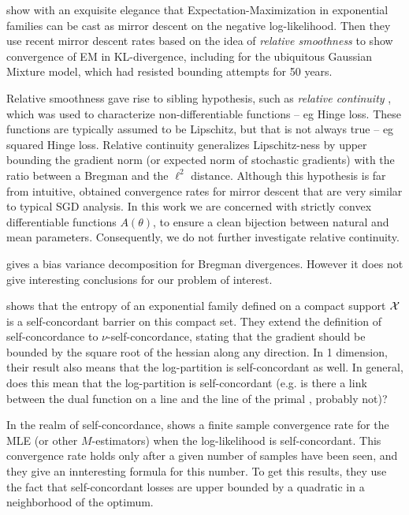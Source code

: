 \documentclass{article}
\newcommand{\logpart}{A}
\newcommand{\nat}{\theta}
\begin{document}
\citet{kunstner2020homeomorphic} show with an exquisite elegance that Expectation-Maximization in exponential families can be cast as mirror descent on the negative log-likelihood. Then they use recent mirror descent rates based on the idea of \textit{relative smoothness} \citep{birnbaum2011distributed, bauschke2017descent, lu2018relatively} to show convergence of EM in KL-divergence, including for the ubiquitous Gaussian Mixture model, which had resisted bounding attempts for 50 years.

Relative smoothness gave rise to sibling hypothesis, such as \textit{relative continuity} \citep{lu2019relative},  which was used to characterize non-differentiable functions -- eg Hinge loss. These functions are typically assumed to be Lipschitz, but that is not always true -- eg squared Hinge loss. Relative continuity generalizes Lipschitz-ness by upper bounding the gradient norm (or expected norm of stochastic gradients) with the ratio between a Bregman and the $\ell^2$ distance. Although this hypothesis is far from intuitive, \citet{lu2019relative} obtained convergence rates for mirror descent that are very similar to typical SGD analysis. In this work we are concerned with strictly convex differentiable functions $\logpart(\nat)$, to ensure a clean bijection between natural and mean parameters. Consequently, we do not further investigate relative continuity.

\citet{pfau2013generalized} gives a bias variance decomposition for Bregman divergences. However it does not give interesting conclusions for our problem of interest.


\citet{bubeck2015entropic} shows that the entropy of an exponential family defined on a compact support ${\mathcal X}$ is a self-concordant barrier on this compact set. They extend the definition of self-concordance to $\nu$-self-concordance, stating that the gradient should be bounded by the square root of the hessian along any direction. In 1 dimension, their result also means that the log-partition is self-concordant as well. In general, does this mean that the log-partition is self-concordant  (e.g. is there a link between the dual function on a line and the line of the primal , probably not)?


In the realm of self-concordance, \citet{ostrovskii2021finite}  shows a finite sample convergence rate for the MLE (or other $M$-estimators)   when  the log-likelihood is self-concordant. This convergence rate holds only after a given number of samples have been seen, and they give an innteresting formula for this number. To get this results, they use the fact that self-concordant losses are upper bounded by a quadratic in a neighborhood of the optimum. 
\end{document}
